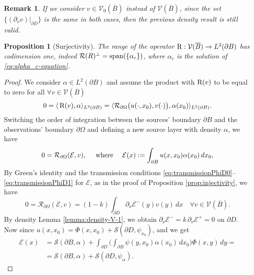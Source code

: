 \documentclass[10pt, a4paper, twoside, openright]{book}
\theoremstyle{definition}
\theoremstyle{plain}
\theoremstyle{plain}
\theoremstyle{plain}
\newtheorem{proposition}[subsection]{Proposition}
\theoremstyle{plain}
\newtheorem{remark}[subsection]{Remark}
\theoremstyle{plain}
\theoremstyle{plain}
\theoremstyle{plain}
\theoremstyle{plain}
\begin{document}
\begin{remark}
 If we consider $v\in\mathcal{V}_0(\overline{B})$ instead of $\mathcal{V}(\overline{B})$, since the set $\{(\partial_\nu v )|_{\partial D}\}$ is the same in both cases, then the previous density result is still valid.
\end{remark}
\begin{proposition}[Surjectivity]
\label{prop:surjectivity}
 The range of the operator $\textup{R} : \mathcal{V}(\overline{B})\to L^2(\partial B)$  has codimension one, indeed $\mathcal{R}(R)^\perp=\textup{span}(\{\alpha_c\})$, where $\alpha_c$ is the solution of \eqref{eq:alpha_c-equation}.
\end{proposition}
\begin{proof}
 We consider $\alpha\in L^2(\partial B)$ and assume the product with $\textup{R}(v)$ to be equal to zero for all $\forall v\in\mathcal{V}(\overline{B})$
 \begin{equation*}
  0 =\langle\,\textup{R}(v), \alpha\rangle_{L^2(\partial B)} = \langle \mathcal{R}_{\partial\Omega}\bigl(u(\cdot,x_0),v(\cdot)\bigr), \alpha(x_0)\rangle_{L^2(\partial B)}.
 \end{equation*}
 Switching the order of integration between the sources' boundary $\partial B$ and
 the observations' boundary $\partial \Omega$ and defining a new source layer with density $\alpha$, 
 we have
 \begin{equation}
  0 = \mathcal{R}_{\partial \Omega}(\mathcal{E},v),\quad\textup{ where }\quad\mathcal{E}(x):=\int_{\partial B}u(x,x_0)\alpha(x_0)\, dx_0,
 \end{equation}
 By Green's identity and the transmission conditions \eqref{eq:transmissionPhiD0}--\eqref{eq:transmissionPhiD1} for $\mathcal{E}$, as in the proof of Proposition \ref{prop:injectivity}, we have
 \begin{equation}
  0 = \mathcal{R}_{\partial \Omega}(\mathcal{E},v)=(1-k)\int_{\partial D} \partial_\nu\mathcal{E}^-(y)v(y)\,dx\quad \forall v \in \mathcal{V}(\overline{B}).
 \end{equation}
 By density Lemma \ref{lemma:density-V-1}, we obtain $\partial_\nu\mathcal{E}^- = k\,\partial_\nu\mathcal{E}^+= 0$ on $\partial D$. 
 Now since $u(x,x_0)=\Phi(x,x_0)+\mathcal{S}(\partial D, \psi_{x_0})$, and we get
 \begin{align}
  \mathcal{E}(x)&=\mathcal{S}(\partial B, \alpha) + \int_{\partial D} \Big(\int_{\partial B}\psi(y,x_0)\alpha(x_0)\,dx_0\Big)\Phi(x,y)\,dy = \\
  &=\mathcal{S}(\partial B, \alpha) + \mathcal{S}(\partial D, \psi_\alpha).

\end{align}
\end{proof}
\end{document}
